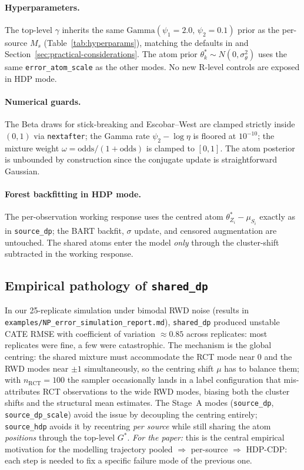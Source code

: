 \documentclass[11pt]{article}
\newcommand{\1}{\mathbf{1}}
\begin{document}
\paragraph{Hyperparameters.} The top-level $\gamma$ inherits the same $\mathrm{Gamma}(\psi_1 = 2.0,\, \psi_2 = 0.1)$ prior as the per-source $M_s$ (Table~\ref{tab:hyperparams}), matching the defaults in \citet{teh2006hierarchical} and Section~\ref{sec:practical-considerations}. The atom prior $\theta^*_k \sim N(0, \sigma_\theta^2)$ uses the same \texttt{error\_atom\_scale} as the other modes. No new R-level controls are exposed in HDP mode.

\paragraph{Numerical guards.} The Beta draws for stick-breaking and Escobar--West are clamped strictly inside $(0, 1)$ via \texttt{nextafter}; the Gamma rate $\psi_2 - \log\eta$ is floored at $10^{-10}$; the mixture weight $\omega = \mathrm{odds}/(1 + \mathrm{odds})$ is clamped to $[0, 1]$. The atom posterior is unbounded by construction since the conjugate update is straightforward Gaussian.

\paragraph{Forest backfitting in HDP mode.} The per-observation working response uses the centred atom $\theta^*_{Z_i} - \mu_{S_i}$ exactly as in \texttt{source\_dp}; the BART backfit, $\sigma$ update, and censored augmentation are untouched. The shared atoms enter the model \emph{only} through the cluster-shift subtracted in the working response.

\subsection{Empirical pathology of \texttt{shared\_dp}}

In our 25-replicate simulation under bimodal RWD noise (results in \texttt{examples/NP\_error\_simulation\_report.md}), \texttt{shared\_dp} produced unstable CATE RMSE with coefficient of variation $\approx 0.85$ across replicates: most replicates were fine, a few were catastrophic. The mechanism is the global centring: the shared mixture must accommodate the RCT mode near $0$ and the RWD modes near $\pm 1$ simultaneously, so the centring shift $\mu$ has to balance them; with $n_\mathrm{RCT} = 100$ the sampler occasionally lands in a label configuration that mis-attributes RCT observations to the wide RWD modes, biasing both the cluster shifts and the structural mean estimates. The Stage~A modes (\texttt{source\_dp}, \texttt{source\_dp\_scale}) avoid the issue by decoupling the centring entirely; \texttt{source\_hdp} avoids it by recentring \emph{per source} while still sharing the atom \emph{positions} through the top-level $G^*$. \emph{For the paper:} this is the central empirical motivation for the modelling trajectory pooled $\Rightarrow$ per-source $\Rightarrow$ HDP-CDP: each step is needed to fix a specific failure mode of the previous one.
\end{document}
